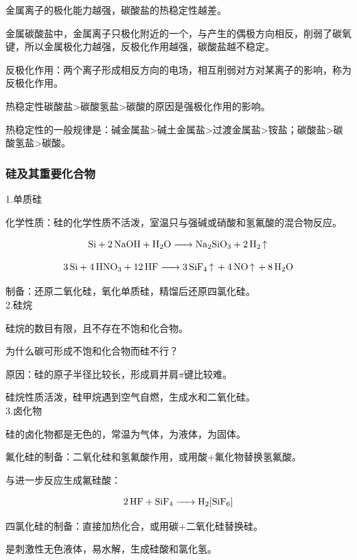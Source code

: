 \documentclass[a4paper,UTF8]{article}
\begin{document}
金属离子的极化能力越强，碳酸盐的热稳定性越差。


金属碳酸盐中，金属离子只极化附近的一个，与产生的偶极方向相反，削弱了碳氧键，所以金属极化力越强，反极化作用越强，碳酸盐越不稳定。

反极化作用：两个离子形成相反方向的电场，相互削弱对方对某离子的影响，称为反极化作用。

热稳定性碳酸盐>碳酸氢盐>碳酸的原因是强极化作用的影响。

热稳定性的一般规律是：碱金属盐>碱土金属盐>过渡金属盐>铵盐；碳酸盐>碳酸氢盐>碳酸。

\subsubsection{硅及其重要化合物}

1.单质硅

化学性质：硅的化学性质不活泼，室温只与强碱或硝酸和氢氟酸的混合物反应。

$$ \ce{Si + 2NaOH + H2O -> Na2SiO3 + 2H2 ^} $$

$$ \ce{3Si + 4HNO3 + 12HF -> 3SiF4 ^ + 4NO ^ + 8H2O} $$

制备：还原二氧化硅，氧化单质硅，精馏后还原四氯化硅。\\

2.硅烷

硅烷的数目有限，且不存在不饱和化合物。

\begin{tcolorbox}

	为什么碳可形成不饱和化合物而硅不行？

	原因：硅的原子半径比较长，形成肩并肩$\pi$键比较难。

\end{tcolorbox}

硅烷性质活泼，硅甲烷遇到空气自燃，生成水和二氧化硅。\\

3.卤化物

硅的卤化物都是无色的，常温为气体，为液体，为固体。

氟化硅的制备：二氧化硅和氢氟酸作用，或用酸+氟化物替换氢氟酸。

与进一步反应生成氟硅酸：

$$ \ce{2HF + SiF4 -> H2[SiF6]} $$

四氯化硅的制备：直接加热化合，或用碳+二氧化硅替换硅。

是刺激性无色液体，易水解，生成硅酸和氯化氢。\\
\end{document}
